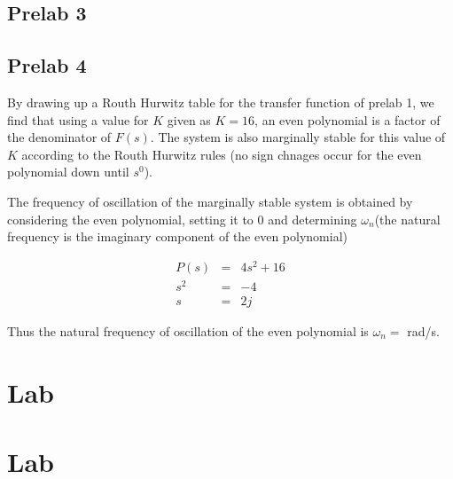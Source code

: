 \documentclass[12pt, a4paper]{article}
\begin{document}

		\subsection{Prelab 3} %
		\label{sub:prelab_3}
		

		\subsection{Prelab 4} %
		\label{sub:prelab_4}
		By drawing up a Routh Hurwitz table for the transfer function of prelab 1, we find that using a value for $K$ given as $K=16$, an even polynomial is a factor of the denominator of $F(s)$. The system is also marginally stable for this value of $K$ according to the Routh Hurwitz rules (no sign chnages occur for the even polynomial down until $s^0$).

		The frequency of oscillation of the marginally stable system is obtained by considering the even polynomial, setting it to 0 and determining $\omega_n $(the natural frequency is the imaginary component of the even polynomial)

		\begin{equation}
			\begin{array}{rcl}
				P(s) & = & 4s^2 +16\\
				s^2	 & = &-4\\
				s    & = & 2j
			\end{array}
		\end{equation}

		Thus the natural frequency of oscillation of the even polynomial is $\omega_n = $ rad/s.
		

	\section{Lab} %
	\label{sec:lab}
	

	\section{Lab} %
	\label{sec:lab}
	
\end{document}
